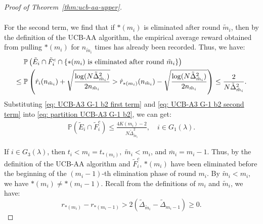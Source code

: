\documentclass[11pt]{article}
\begin{document}
\begin{proof}[Proof of Theorem~\ref{thm:ucb-aa-upper}]
\begin{itemize}
\begin{align}
\label{eq: UCB-A3 G-1 b2 first term}
\end{align}
For the second term, we find that if $*(m_i)$ is eliminated after round $\tilde{m}_i$, then by the definition of the UCB-AA algorithm, the empirical average reward obtained from pulling $*(m_i)$ for $n_{\tilde{m}_i}$ times has already been recorded. Thus, we have:
\begin{align}
    &\;\mathbb{P}\left(\tilde{E}_i\cap\tilde{F}_i^c\cap\{\text{$*(m_i)$ is eliminated after round }\tilde{m}_i\}\right)\notag\\
\leq &\;\mathbb{P}\left(\hat{r}_i(n_{\tilde{m}_i}) + \sqrt{\frac{\log(N \tilde{\Delta}_{\tilde{m}_i}^2)}{2n_{\tilde{m}_i}}} >\hat{r}_{*(m_i)}(n_{\tilde{m}_i}) - \sqrt{\frac{\log(N \tilde{\Delta}_{\tilde{m}_i}^2)}{2n_{\tilde{m}_i}}}\right)\leq \frac{2}{N\tilde{\Delta}_{\tilde{m}_i}^2}.
\label{eq: UCB-A3 G-1 b2 second term}
\end{align}
Substituting \eqref{eq: UCB-A3 G-1 b2 first term} and \eqref{eq: UCB-A3 G-1 b2 second term} into \eqref{eq: partition UCB-A3 G-1 b2}, we can get:
\begin{align}
    \mathbb{P}\left(\tilde{E}_i\cap\tilde{F}_i^c\right)\leq \frac{4K(m_i)-2}{N\tilde{\Delta}_{\tilde{m}_i}^2},\quad i\in G_1(\lambda).
    \label{eq: UCB-A3 G-1 b2}
\end{align}
\end{itemize}

If $i\in G_3(\lambda)$, then $t_i<m_i=t_{*(m_i)},\; \tilde{m}_i<m_i$, and $\overline{m}_i=m_i-1$. Thus, by the definition of the UCB-AA algorithm and $\tilde{F}_i^c$, $*(m_i)$ have been eliminated before the beginning of the $(m_i-1)$-th elimination phase of round $m_i$. By $\tilde{m}_i<m_i$, we have $*(m_i)\neq *(m_i-1)$. Recall from the definitions of $m_i$ and $\tilde{m}_i$, we have:
\[r_{*(m_i)}-r_{*(m_i-1)}>2\left(\tilde{\Delta}_{\tilde{m}_i}-\tilde{\Delta}_{m_i-1}\right)\geq 0.\]


\end{proof}
\end{document}
